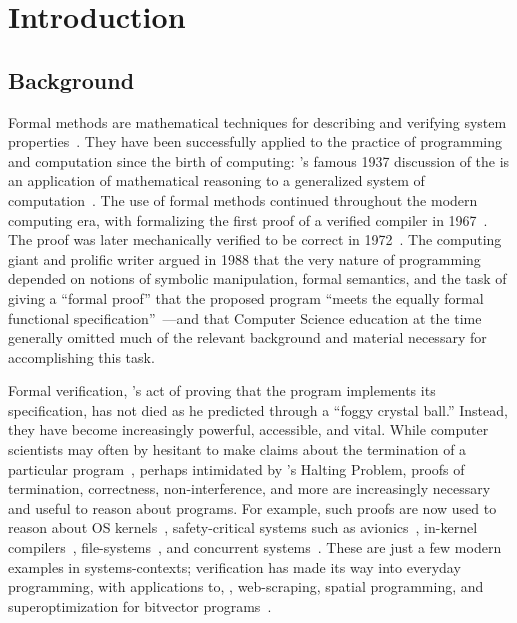 \section{Introduction}

\subsection{Background}

Formal methods are mathematical techniques for describing and verifying system
properties~\cite{Wing_90}. They have been successfully applied to the practice
of programming and computation since the birth of computing:
\citeauthor{Turing_1937}'s famous 1937 discussion of the {\haltprob} is an
application of mathematical reasoning to a generalized system of
computation~\cite{Turing_1937}. The use of formal methods continued throughout
the modern computing era, with \citeauthor{McCarthy_67} formalizing the first
proof of a verified compiler in 1967~\cite{McCarthy_67}. The proof was later
mechanically verified to be correct in 1972~\cite{Milner_72}. The computing
giant and prolific writer \citeauthor{EWD:EWD1036} argued in 1988 that the very
nature of programming depended on notions of symbolic manipulation, formal
semantics, and the task of giving a ``formal proof'' that the proposed program
``meets the equally formal functional specification''~\cite{EWD:EWD1036}---and
that Computer Science education at the time generally omitted much of the
relevant background and material necessary for accomplishing this task.

Formal verification, \citeauthor{EWD:EWD1036}'s act of proving that the program
implements its specification, has not died as he predicted through a ``foggy
crystal ball.'' Instead, they have become increasingly powerful, accessible, and
vital. While computer scientists may often by hesitant to make claims about the
termination of a particular program~\cite{Cook_2011}, perhaps intimidated by
\citeauthor{Turing_1937}'s Halting Problem, proofs of termination, correctness,
non-interference, and more are increasingly necessary and useful to reason about
programs. For example, such proofs are now used to reason about OS
kernels~\cite{Klein_EHACDEEKNSTW_09,Klein_AEHCDEEKNSTW_10,Klein_AEMSKH_14,Sewell_KH_16,Narayanan_2019,Narayan_2020},
safety-critical systems such as avionics~\cite{Leroy-Compcert-CACM}, in-kernel
compilers~\cite{186144,258848}, file-systems~\cite{Zou_2019}, and concurrent
systems~\cite{222565,222621}. These are just a few modern examples in
systems-contexts; verification has made its way into everyday programming, with
applications to, \eg, web-scraping, spatial programming, and superoptimization
for bitvector programs~\cite{Torlak_2013}.

